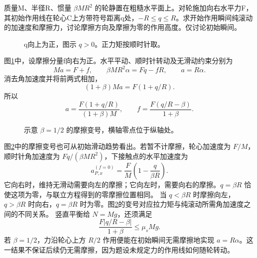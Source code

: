 \begin{exercise}[水平拉力的作用高度]\label{deep6:problem-exercise-5}\label{deep6:ex:d5-h5}
质量M、半径R、惯量 $\beta MR^2$ 的轮静置在粗糙水平面上。对轮施加向右水平力F，其初始作用线在轮心C上方带符号距离q处，$-R\le q\le R$。求开始作用瞬间纯滚动的加速度和摩擦力，讨论摩擦方向及摩擦为零的作用高度。仅讨论初始瞬间。
\end{exercise}
\begin{figure}[H]\centering
{}
\caption{q向上为正，图示 $q>0$。正力矩按顺时针取。}\label{deep6:fig:d5-h5-q}
\end{figure}
\begin{solution}
图\ref{deep6:fig:d5-h5-q}中，设摩擦分量f向右为正。水平平动、顺时针转动及无滑动约束分别为
\[
Ma=F+f,\qquad \beta MR^2\alpha=Fq-fR,
\qquad a=R\alpha.
\]
消去角加速度并将前两式相加，
\[
(1+\beta)Ma=F(1+q/R).
\]
所以
\[
a=\frac{F(1+q/R)}{(1+\beta)M},\qquad
f=\frac{F(q/R-\beta)}{1+\beta}.
\]
\begin{figure}[H]\centering
{}
\caption{示意 $\beta=1/2$ 的摩擦变号，横轴零点位于纵轴处。}\label{deep6:fig:d5-h5-s}
\end{figure}
图\ref{deep6:fig:d5-h5-s}中的摩擦变号也可从初始滑动趋势看出。若暂不计摩擦，轮心加速度为 $F/M$，顺时针角加速度为 $Fq/(\beta MR^2)$，下接触点的水平加速度为
\[
a_{P,x}^{(f=0)}=\frac FM\left(1-\frac{q}{\beta R}\right).
\]
它向右时，维持无滑动需要向左的摩擦；它向左时，需要向右的摩擦。$q=\beta R$ 恰使这项为零，与联立方程得到的零摩擦位置相同。
当 $q<\beta R$ 时摩擦向左，$q>\beta R$ 时向右，$q=\beta R$ 时为零。图\ref{deep6:fig:d5-h5-s}的变号对应拉力矩与纯滚动所需角加速度之间的不同关系。
竖直平衡给 $N=Mg$，还须满足
\[
\frac{F|q/R-\beta|}{1+\beta}\le\mu_sMg.
\]
若 $\beta=1/2$，力沿轮心上方 $R/2$ 作用便能在初始瞬间无需摩擦地实现 $a=R\alpha$。这一结果不保证后续仍无需摩擦，因为题设未规定力的作用线如何随轮转动。
\end{solution}


